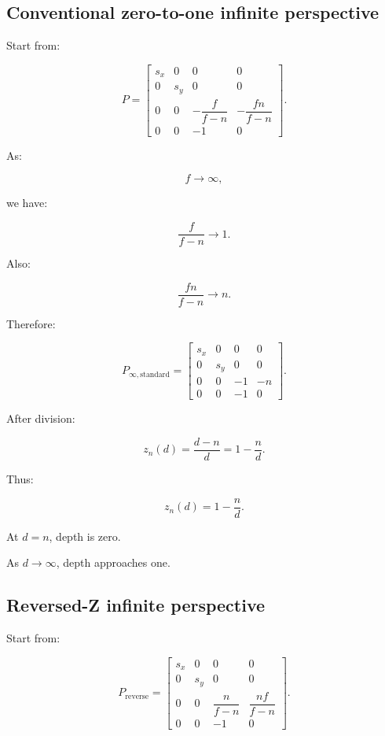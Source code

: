 \subsection{Conventional zero-to-one infinite perspective}\label{02-foundations-ii-ch033-conventional-zero-to-one-infinite-perspective}

Start from:

\[
 P= \begin{bmatrix} s_x&0&0&0\\ 0&s_y&0&0\\ 0&0&-\dfrac f{f-n}&-\dfrac{fn}{f-n}\\ 0&0&-1&0 \end{bmatrix}.
\]

As:

\[
 f\to\infty,
\]

we have:

\[
 \frac f{f-n}\to1.
\]

Also:

\[
 \frac{fn}{f-n}\to n.
\]

Therefore:

\[
 \boxed{ P_{\infty,\mathrm{standard}}= \begin{bmatrix} s_x&0&0&0\\ 0&s_y&0&0\\ 0&0&-1&-n\\ 0&0&-1&0 \end{bmatrix} }.
\]

After division:

\[
 z_n(d)= \frac{d-n}{d} = 1-\frac nd.
\]

Thus:

\[
 \boxed{ z_n(d)=1-\frac nd }.
\]

At \(d=n\), depth is zero.

As \(d\to\infty\), depth approaches one.

\subsection{Reversed-Z infinite perspective}\label{02-foundations-ii-ch033-reversed-z-infinite-perspective}

Start from:

\[
 P_{\mathrm{reverse}}= \begin{bmatrix} s_x&0&0&0\\ 0&s_y&0&0\\ 0&0&\dfrac n{f-n}&\dfrac{nf}{f-n}\\ 0&0&-1&0 \end{bmatrix}.
\]

